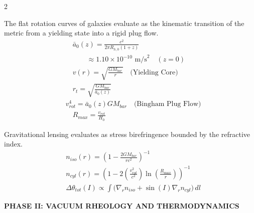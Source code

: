 \begin{multicols}{2}
\begin{tcolorbox}[cheatbox, title={\refstepcounter{cheatnum}\label{box:galactic_dynamics}\thecheatnum. Galactic Kinematics \& The Continuum Shear Transition \hfill\makebox[0pt][r]{\scriptsize\hyperref[sec:deriv_galactic_dynamics]{[Proof $\downarrow$]}}}]
The flat rotation curves of galaxies evaluate as the kinematic transition of the metric from a yielding state into a rigid plug flow.
\begin{align}
    &\quad \bar{a}_0(z) = \frac{c^2}{2\pi R_{h,0}(1+z)} \label{eq:a0z} \\
    & \quad \quad  \quad \approx 1.10 \times 10^{-10} \text{ m/s}^2 \quad (z = 0) \nonumber \\
    &\quad v(r) = \sqrt{\frac{G M_{bar}}{r}} \quad \text{(Yielding Core)} \label{eq:kepler_core} \\
    &\quad r_t = \sqrt{\frac{G M_{bar}}{\bar{a}_0(z)}} \label{eq:transition_radius} \\
    &v_{rot}^4 = \bar{a}_0(z) G M_{bar} \quad \text{(Bingham Plug Flow)} \label{eq:tully_fisher_derivation} \\
    &\quad R_{max} = \frac{v_{rot}}{H_0} \label{eq:r_max}
\end{align}
\end{tcolorbox}

\begin{tcolorbox}[cheatbox, title={\refstepcounter{cheatnum}\label{box:galactic_lensing}\thecheatnum. Galactic Lensing (Stress Birefringence) \hfill\makebox[0pt][r]{\scriptsize\hyperref[sec:deriv_galactic_lensing]{[Proof $\downarrow$]}}}]
Gravitational lensing evaluates as stress birefringence bounded by the refractive index. 
\begin{align}
    &n_{iso}(r) = \left( 1 - \frac{2G M_{bar}}{r c^2} \right)^{-1}  \label{eq:n_isotropic} \\
    &n_{cyl}(r) = \left( 1 - 2\left(\frac{v_{rot}^2}{c^2}\right) \ln \left( \frac{R_{max}}{r} \right) \right)^{-1}  \label{eq:n_cylindrical} \\
    &\Delta \theta_{tot}(I) \propto \int \Big( \nabla_r n_{iso} + \sin(I) \nabla_r n_{cyl} \Big) \, dl \label{eq:total_deflection} 
\end{align}
\end{tcolorbox}
\columnbreak
\vspace{0.2cm}
\noindent\textbf{\large \color{academiabrown} PHASE II: VACUUM RHEOLOGY AND THERMODYNAMICS}
\vspace{0.2cm}


\end{multicols}

